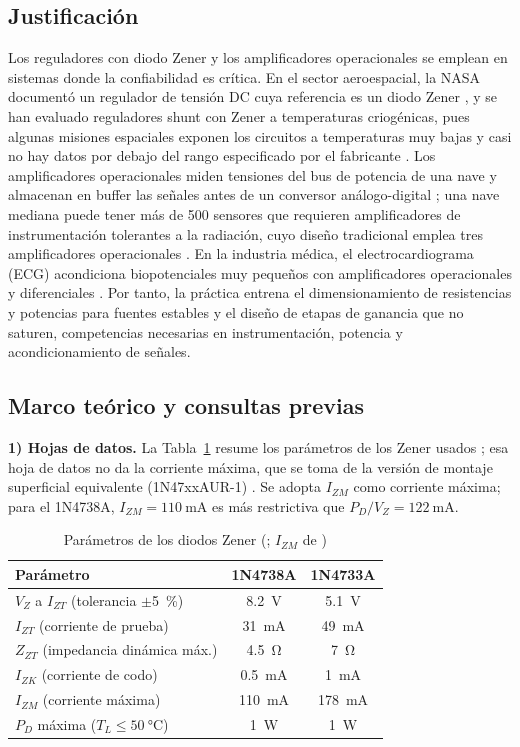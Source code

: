 \documentclass[9pt, conference]{IEEEtran}
\newcommand{\qV}[1]{\SI{#1}{\volt}}
\newcommand{\qmA}[1]{\SI{#1}{\milli\ampere}}
\newcommand{\qohm}[1]{\SI{#1}{\ohm}}
\newcommand{\qW}[1]{\SI{#1}{\watt}}
\newcommand{\pct}[1]{\SI{#1}{\percent}}
\begin{document}
\subsection{Justificación}
Los reguladores con diodo Zener y los amplificadores operacionales se emplean en sistemas donde la confiabilidad es crítica. En el sector aeroespacial, la NASA documentó un regulador de tensión DC cuya referencia es un diodo Zener \cite{nasa}, y se han evaluado reguladores shunt con Zener a temperaturas criogénicas, pues algunas misiones espaciales exponen los circuitos a temperaturas muy bajas y casi no hay datos por debajo del rango especificado por el fabricante \cite{cryo}. Los amplificadores operacionales miden tensiones del bus de potencia de una nave y almacenan en buffer las señales antes de un conversor análogo-digital \cite{tispace}; una nave mediana puede tener más de 500 sensores que requieren amplificadores de instrumentación tolerantes a la radiación, cuyo diseño tradicional emplea tres amplificadores operacionales \cite{renesas}. En la industria médica, el electrocardiograma (ECG) acondiciona biopotenciales muy pequeños con amplificadores operacionales y diferenciales \cite{penn}. Por tanto, la práctica entrena el dimensionamiento de resistencias y potencias para fuentes estables y el diseño de etapas de ganancia que no saturen, competencias necesarias en instrumentación, potencia y acondicionamiento de señales.

\subsection{Marco teórico y consultas previas}
\textbf{1) Hojas de datos.} La Tabla~\ref{tab:zener_ds} resume los parámetros de los Zener usados \cite{fairchild}; esa hoja de datos no da la corriente máxima, que se toma de la versión de montaje superficial equivalente (1N47xxAUR-1) \cite{microsemi}. Se adopta $I_{ZM}$ como corriente máxima; para el 1N4738A, $I_{ZM}=\qmA{110}$ es más restrictiva que $P_D/V_Z=\qmA{122}$.

\begin{table}[htbp]
\caption{Parámetros de los diodos Zener (\cite{fairchild}; $I_{ZM}$ de \cite{microsemi})}
\label{tab:zener_ds}
\centering
\footnotesize
\begin{tabular}{lcc}
\toprule
Parámetro & 1N4738A & 1N4733A \\
\midrule
$V_Z$ a $I_{ZT}$ (tolerancia $\pm$\pct{5}) & \qV{8.2} & \qV{5.1} \\
$I_{ZT}$ (corriente de prueba) & \qmA{31} & \qmA{49} \\
$Z_{ZT}$ (impedancia dinámica máx.) & \qohm{4.5} & \qohm{7} \\
$I_{ZK}$ (corriente de codo) & \qmA{0.5} & \qmA{1} \\
$I_{ZM}$ (corriente máxima) & \qmA{110} & \qmA{178} \\
$P_D$ máxima ($T_L\le \SI{50}{\celsius}$) & \qW{1} & \qW{1} \\
\bottomrule
\end{tabular}
\end{table}
\end{document}
